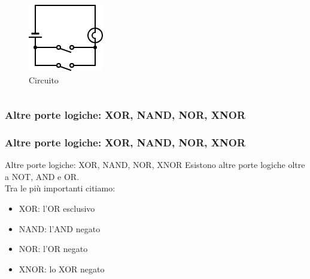 \begin{frame}
\begin{columns}
		\begin{figure}[!htbp]
			\centering 
			\includegraphics[width=0.85\linewidth]{images/2_le_architetture/logic_gate_circuit_or.png}
			\caption{Circuito}
		\end{figure}
		
	\end{columns}
	
\end{frame}



\subsubsection[Altre porte logiche: XOR, NAND, NOR, XNOR]{Altre porte logiche: XOR, NAND, NOR, XNOR}
\begin{frame}
	\frametitle{Altre porte logiche: XOR, NAND, NOR, XNOR}
	
	
	\begin{block}{Altre porte logiche: XOR, NAND, NOR, XNOR}
		Esistono altre porte logiche oltre a NOT, AND e OR.\\
		Tra le più importanti citiamo:
		\begin{itemize}
			\item XOR: l'OR esclusivo
			\item NAND: l'AND negato
			\item NOR: l'OR negato
			\item XNOR: lo XOR negato
		\end{itemize}
	\end{block}
	
\end{frame}


